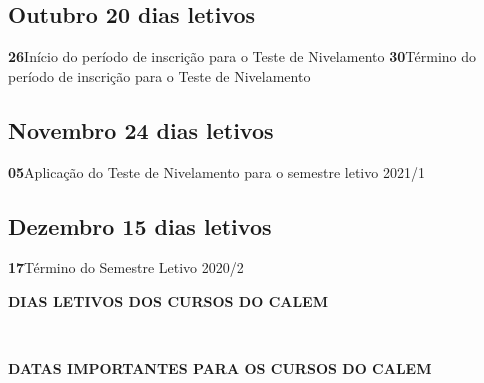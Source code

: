\documentclass[thesis]{hmcposter}
\begin{document}
\begin{poster}
							\subsection{Outubro \hfill 20 dias letivos}\textbf{26}\qquad Início do período de inscrição para o Teste de Nivelamento \newline \null\textbf{30}\qquad Término do período de inscrição para o Teste de Nivelamento \newline \null\subsection{Novembro \hfill 24 dias letivos}\textbf{05}\qquad Aplicação do Teste de Nivelamento para o semestre letivo 2021/1 \newline \null\subsection{Dezembro \hfill 15 dias letivos}\textbf{17}\qquad Término do Semestre Letivo 2020/2 \newline \null\newpage
~
\vfill
\begin{center}
\large \textbf{DIAS LETIVOS DOS CURSOS DO CALEM}
\newline
\null
\newline
\begin{table}
\centering
{}
\end{table}
\newline
\null
\newline
\end{center}
\vfill
\null
\columnbreak
~
\vfill
\begin{center}
\large \textbf{DATAS IMPORTANTES PARA OS CURSOS DO CALEM}
\newline
\null
\newline
\begin{table}
\centering
\resizebox{0.9\columnwidth}{!}{
}
\end{table}
\end{center}
\end{poster}
\end{document}
